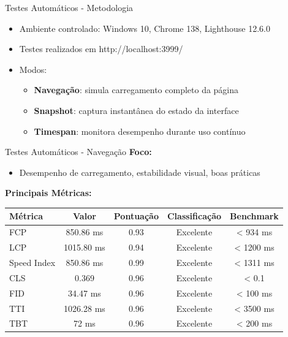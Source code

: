 \documentclass[landscape, 12pt]{beamer}
\begin{document}
\begin{frame}{Testes Automáticos - Metodologia}
    \begin{itemize}
        \item Ambiente controlado: Windows 10, Chrome 138, Lighthouse 12.6.0
        \item Testes realizados em http://localhost:3999/
        \item Modos:
        \begin{itemize}
            \item \textbf{Navegação}: simula carregamento completo da página
            \item \textbf{Snapshot}: captura instantânea do estado da interface
            \item \textbf{Timespan}: monitora desempenho durante uso contínuo
        \end{itemize}
    \end{itemize}
\end{frame}

\begin{frame}{Testes Automáticos - Navegação}
    \textbf{Foco:}
    \begin{itemize}
        \item Desempenho de carregamento, estabilidade visual, boas práticas
    \end{itemize}
    \vspace{0.3cm}
    \textbf{Principais Métricas:}
    \begin{table}[h]
    \centering
    \scriptsize
    \begin{tabular}{|l|c|c|c|c|}
    \hline
    \textbf{Métrica} & \textbf{Valor} & \textbf{Pontuação} & \textbf{Classificação} & \textbf{Benchmark} \\
    \hline
    FCP & 850.86 ms & 0.93 & Excelente & < 934 ms \\
    LCP & 1015.80 ms & 0.94 & Excelente & < 1200 ms \\
    Speed Index & 850.86 ms & 0.99 & Excelente & < 1311 ms \\
    CLS & 0.369 & 0.96 & Excelente & < 0.1 \\
    FID & 34.47 ms & 0.96 & Excelente & < 100 ms \\
    TTI & 1026.28 ms & 0.96 & Excelente & < 3500 ms \\
    TBT & 72 ms & 0.96 & Excelente & < 200 ms \\
    \hline
    \end{tabular}
    \end{table}
\end{frame}
\end{document}
